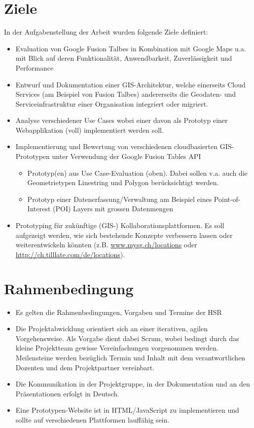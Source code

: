 \section{Ziele}
In der Aufgabenstellung der Arbeit wurden folgende Ziele definiert:
\begin{itemize}
\item Evaluation von Google Fusion Talbes in Kombination mit Google Maps u.a. mit Blick auf deren Funktionalität, Anwendbarkeit, Zuverlässigkeit und Performance
\item Entwurf und Dokumentation einer GIS-Architektur, welche einerseits Cloud Services (am Beispiel von Fusion Talbes) andererseits die Geodaten- und Serviceinfrastruktur einer Organisation integriert oder migriert.
\item Analyse verschiedener Use Cases wobei einer davon als Prototyp einer Webapplikation (voll) implementiert werden soll. 
\item Implementierung und Bewertung von verschiedenen cloudbasierten GIS-Prototypen unter Verwendung der Google Fusion Tables API
\begin{itemize}
	\item Prototyp(en) aus Use Case-Evaluation (oben). Dabei sollen v.a. auch die Geometrietypen Linestring und Polygon berücksichtigt werden.
	\item Prototyp einer Datenerfassung/Verwaltung am Beispiel eines Point-of-Interest (POI) Layers mit grossen Datenmengen
\end{itemize}
\item Prototyping für zukünftige (GIS-) Kollaborationsplattformen. Es soll aufgezeigt werden, wie sich bestehende Konzepte verbessern lassen oder weiterentwickeln könnten (z.B. \url{www.mysg.ch/locations} oder \url{http://ch.tilllate.com/de/locations}).
\end{itemize}

\section{Rahmenbedingung}
\begin{itemize}
\item Es gelten die Rahmenbedingungen, Vorgaben und Termine der HSR
\item Die Projektabwicklung orientiert sich an einer iterativen, agilen Vorgehensweise. Als Vorgabe dient dabei Scrum, wobei bedingt durch das kleine Projektteam gewisse Vereinfachungen vorgenommen werden. Meilensteine werden bezüglich Termin und Inhalt mit dem verantwortlichen Dozenten und dem Projektpartner vereinbart.
\item Die Kommunikation in der Projektgruppe, in der Dokumentation und an den Präsentationen erfolgt in Deutsch.
\item Eine Prototypen-Website ist in HTML/JavaScript zu implementieren und sollte auf verschiedenen Plattformen lauffähig sein.
\end{itemize}

